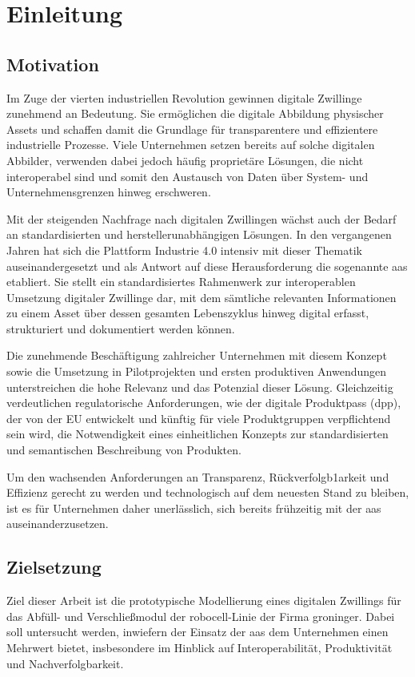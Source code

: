 \section{Einleitung}
\subsection{Motivation}
\label{sec:Motivation}
Im Zuge der vierten industriellen Revolution gewinnen digitale Zwillinge zunehmend an Bedeutung. 
Sie ermöglichen die digitale Abbildung physischer Assets und schaffen damit die Grundlage für transparentere und effizientere industrielle Prozesse.
Viele Unternehmen setzen bereits auf solche digitalen Abbilder, verwenden dabei jedoch häufig proprietäre Lösungen, die nicht interoperabel sind und somit den Austausch von Daten über System- und Unternehmensgrenzen hinweg erschweren. 

Mit der steigenden Nachfrage nach digitalen Zwillingen wächst auch der Bedarf an standardisierten und herstellerunabhängigen Lösungen. 
In den vergangenen Jahren hat sich die Plattform Industrie 4.0 intensiv mit dieser Thematik auseinandergesetzt und als Antwort auf diese Herausforderung die sogenannte \ac{aas} etabliert.
Sie stellt ein standardisiertes Rahmenwerk zur interoperablen Umsetzung digitaler Zwillinge dar, mit dem sämtliche relevanten Informationen zu einem Asset über dessen gesamten Lebenszyklus hinweg digital erfasst, strukturiert und dokumentiert werden können.

Die zunehmende Beschäftigung zahlreicher Unternehmen mit diesem Konzept sowie die Umsetzung in Pilotprojekten und ersten produktiven Anwendungen unterstreichen die hohe Relevanz und das Potenzial dieser Lösung. 
Gleichzeitig verdeutlichen regulatorische Anforderungen, wie der digitale Produktpass (\acs{dpp}), der von der EU entwickelt und künftig für viele Produktgruppen verpflichtend sein wird, die Notwendigkeit eines einheitlichen Konzepts zur standardisierten und semantischen Beschreibung von Produkten.

Um den wachsenden Anforderungen an Transparenz, Rückverfolgb1arkeit und Effizienz gerecht zu werden und technologisch auf dem neuesten Stand zu bleiben, ist es für Unternehmen daher unerlässlich, sich bereits frühzeitig mit der \acs{aas} auseinanderzusetzen.

\subsection{Zielsetzung}
Ziel dieser Arbeit ist die prototypische Modellierung eines digitalen Zwillings für das Abfüll- und Verschließmodul der robocell-Linie der Firma groninger. 
Dabei soll untersucht werden, inwiefern der Einsatz der \acs{aas} dem Unternehmen einen Mehrwert bietet, insbesondere im Hinblick auf Interoperabilität, Produktivität und Nachverfolgbarkeit.

